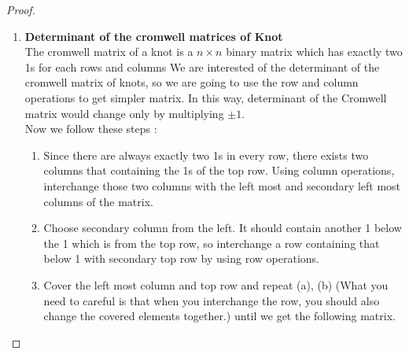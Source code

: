 \documentclass{article}
\theoremstyle{definition}
\theoremstyle{theorem}
\theoremstyle{proposition}
\theoremstyle{corollary}
\begin{document}
\begin{proof}
\begin{enumerate}
    \item \textbf{Determinant of the cromwell matrices of Knot}\\
    The cromwell matrix of a knot is a $n\times n$ binary matrix which has exactly two 1s for each rows and columns
    We are interested of the determinant of the cromwell matrix of knots, so we are going to use the row and column operations to get simpler matrix.
    In this way, determinant of the Cromwell matrix would change only by multiplying $\pm 1$.\\
    Now we follow these steps : \\
    \begin{enumerate}
        \item Since there are always exactly two 1s in every row, there exists two columns that containing the 1s of the top row. Using column operations, interchange those two columns with the left most and secondary left most columns of the matrix.
        \item Choose secondary column from the left. It should contain another 1 below the 1 which is from the top row, so interchange a row containing that below 1 with secondary top row by using row operations.
        \item Cover the left most column and top row and repeat (a), (b) (What you need to careful is that when you interchange the row, you should also change the covered elements together.) until we get the following matrix.
    \end{enumerate}
    

\end{enumerate}
\end{proof}
\end{document}
